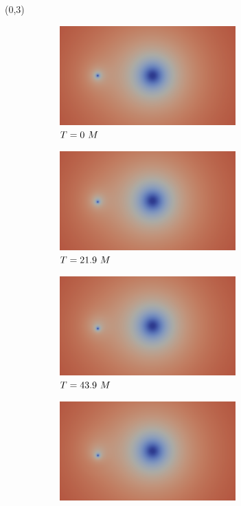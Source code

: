 \documentclass[landscape]{a0poster}
\begin{document}
\begin{textblock}{62}
\begin{textblock}{38}(0,3)
	\begin{figure}
		\begin{subfigure}{0.0714\textwidth}
			\centering
			\includegraphics[height=1.5in]{figs/AE/r10/img_slice_000000.png}
			\caption{\small ${T}=0~M$}
		\end{subfigure}
		\begin{subfigure}{0.0714\textwidth}
			\centering
			\includegraphics[height=1.5in]{figs/AE/r10/img_slice_000010.png}
			\caption{\small ${T}=21.9~M$}
		\end{subfigure}
		\begin{subfigure}{0.0714\textwidth}
			\centering
			\includegraphics[height=1.5in]{figs/AE/r10/img_slice_000020.png}
			\caption{\small ${T}=43.9~M$}
		\end{subfigure}
		\begin{subfigure}{0.0714\textwidth}
			\centering
			\includegraphics[height=1.5in]{figs/AE/r10/img_slice_000030.png}

\end{subfigure}
\end{figure}
\end{textblock}
\end{textblock}
\end{document}
